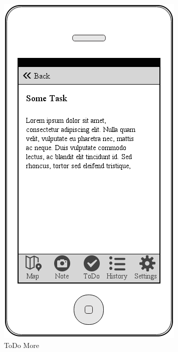 \documentclass[12pt]{article}
\begin{document}
\begin{figure}[ht]
	\centering
	\includegraphics[width=\linewidth, height=0.4\textheight, keepaspectratio=true]{mockups/ToDoMore.png}
	\caption{ToDo More}
	\endminipage\hfill
	\centering

\end{figure}
\end{document}
